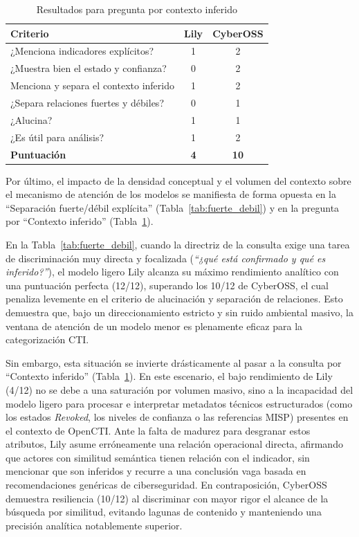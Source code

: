 \documentclass[12pt]{report}
\begin{document}
\begin{table}[H]
	\centering
	\small
	\begin{tabular}{ l c c }
		\toprule
		\textbf{Criterio} & \textbf{Lily} & \textbf{CyberOSS}  \\
		\midrule
		¿Menciona indicadores explícitos? & 1 & 2 \\
		¿Muestra bien el estado y confianza? & 0 & 2 \\
		Menciona y separa el contexto inferido & 1 & 2 \\
		¿Separa relaciones fuertes y débiles?  & 0 & 1 \\
		¿Alucina? & 1 & 1 \\
		¿Es útil para análisis? & 1 & 2 \\
		\midrule
		\textbf{Puntuación} & \textbf{4} & \textbf{10} \\
		\bottomrule
	\end{tabular}
	\caption{Resultados para pregunta por contexto inferido}
	\label{tab:contexto}
\end{table}
Por último, el impacto de la densidad conceptual y el volumen del contexto sobre el mecanismo de atención de los modelos se manifiesta de forma opuesta en la ``Separación fuerte/débil explícita'' (Tabla~\ref{tab:fuerte_debil}) y en la pregunta por ``Contexto inferido'' (Tabla~\ref{tab:contexto}). 

En la Tabla~\ref{tab:fuerte_debil}, cuando la directriz de la consulta exige una tarea de discriminación muy directa y focalizada (\textit{``¿qué está confirmado y qué es inferido?''}), el modelo ligero Lily alcanza su máximo rendimiento analítico con una puntuación perfecta (12/12), superando los 10/12 de CyberOSS, el cual penaliza levemente en el criterio de alucinación y separación de relaciones. Esto demuestra que, bajo un direccionamiento estricto y sin ruido ambiental masivo, la ventana de atención de un modelo menor es plenamente eficaz para la categorización CTI.

Sin embargo, esta situación se invierte drásticamente al pasar a la consulta por ``Contexto inferido'' (Tabla~\ref{tab:contexto}). En este escenario, el bajo rendimiento de Lily (4/12) no se debe a una saturación por volumen masivo, sino a la incapacidad del modelo ligero para procesar e interpretar metadatos técnicos estructurados (como los estados \textit{Revoked}, los niveles de confianza o las referencias MISP) presentes en el contexto de OpenCTI. Ante la falta de madurez para desgranar estos atributos, Lily asume erróneamente una relación operacional directa, afirmando que actores con similitud semántica tienen relación con el indicador, sin mencionar que son inferidos y recurre a una conclusión vaga basada en recomendaciones genéricas de ciberseguridad. En contraposición, CyberOSS demuestra resiliencia (10/12) al discriminar con mayor rigor el alcance de la búsqueda por similitud, evitando lagunas de contenido y manteniendo una precisión analítica notablemente superior.
\end{document}
